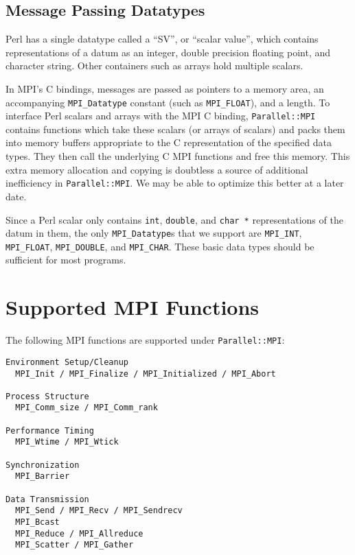 \documentclass{report}
\begin{document}
\subsection*{Message Passing Datatypes}

	Perl has a single datatype called a ``SV'', or ``scalar
value'', which contains representations of a datum as an integer,
double precision floating point, and character string.  Other
containers such as arrays hold multiple scalars.

	In MPI's C bindings, messages are passed as pointers to a
memory area, an accompanying \verb|MPI_Datatype| constant (such as
\verb|MPI_FLOAT|), and a length.  To interface Perl scalars and arrays 
with the MPI C binding, \verb|Parallel::MPI| contains functions which
take these scalars (or arrays of scalars) and packs them into memory buffers
appropriate to the C representation of the specified data types.  They then
call the underlying C MPI functions and free this memory.  This extra memory
allocation and copying is doubtless a source of additional
inefficiency in \verb|Parallel::MPI|.  We may be able to optimize this 
better at a later date.

	Since a Perl scalar only contains \verb|int|, \verb|double|, and
\verb|char *| representations of the datum in them, the only
\verb|MPI_Datatype|s that we support are \verb|MPI_INT|,
\verb|MPI_FLOAT|, \verb|MPI_DOUBLE|, and \verb|MPI_CHAR|.   These basic
data types should be sufficient for most programs. 

\section*{Supported MPI Functions}

The following MPI functions are supported under \verb|Parallel::MPI|:

\begin{verbatim}
Environment Setup/Cleanup
  MPI_Init / MPI_Finalize / MPI_Initialized / MPI_Abort

Process Structure
  MPI_Comm_size / MPI_Comm_rank

Performance Timing
  MPI_Wtime / MPI_Wtick

Synchronization
  MPI_Barrier

Data Transmission
  MPI_Send / MPI_Recv / MPI_Sendrecv
  MPI_Bcast
  MPI_Reduce / MPI_Allreduce
  MPI_Scatter / MPI_Gather		  
\end{verbatim}
\end{document}
